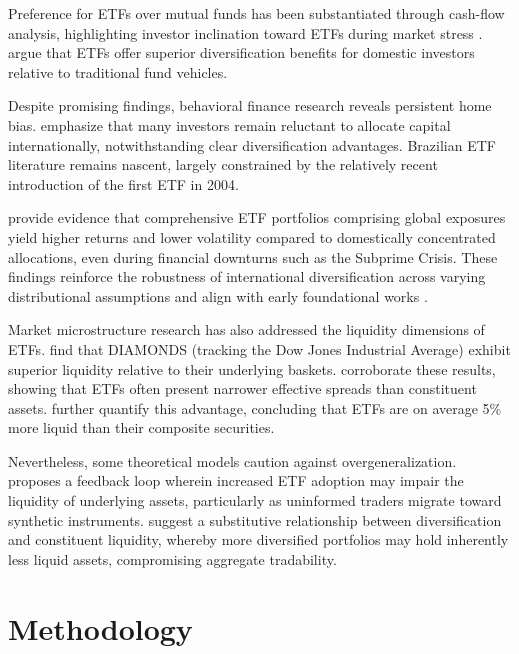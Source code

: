 \documentclass{article}
\begin{document}
Preference for ETFs over mutual funds has been substantiated through cash-flow analysis, highlighting investor inclination toward ETFs during market stress \citep{Boney_Doran_Peterson_2016}. \citet{Tsai_Swanson_2009} argue that ETFs offer superior diversification benefits for domestic investors relative to traditional fund vehicles.

Despite promising findings, behavioral finance research reveals persistent home bias. \citet{Neves_Fernandes_Martins_2019} emphasize that many investors remain reluctant to allocate capital internationally, notwithstanding clear diversification advantages. Brazilian ETF literature remains nascent, largely constrained by the relatively recent introduction of the first ETF in 2004.

\citet{Huang_Lin_2011} provide evidence that comprehensive ETF portfolios comprising global exposures yield higher returns and lower volatility compared to domestically concentrated allocations, even during financial downturns such as the Subprime Crisis. These findings reinforce the robustness of international diversification across varying distributional assumptions and align with early foundational works \citep{Levy_Sarnat_Marshall_1970, Meric_Meric_1989, Harvey_1995, Solnik_Boucrelle_Fur_1996, Jorion_Goetzmann_1999}.

Market microstructure research has also addressed the liquidity dimensions of ETFs. \citet{Hegde_McDermott_2004} find that DIAMONDS (tracking the Dow Jones Industrial Average) exhibit superior liquidity relative to their underlying baskets. \citet{Levy_Sarnat_Marshall_1970} corroborate these results, showing that ETFs often present narrower effective spreads than constituent assets. \citet{Broman_Shum_2018} further quantify this advantage, concluding that ETFs are on average 5\% more liquid than their composite securities.

Nevertheless, some theoretical models caution against overgeneralization. \citet{Hamm_2014} proposes a feedback loop wherein increased ETF adoption may impair the liquidity of underlying assets, particularly as uninformed traders migrate toward synthetic instruments. \citet{Pastor_Stambaugh_Taylor_2020} suggest a substitutive relationship between diversification and constituent liquidity, whereby more diversified portfolios may hold inherently less liquid assets, compromising aggregate tradability.

\section{Methodology}
\end{document}
